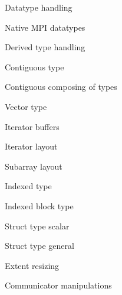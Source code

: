 \documentclass[10pt]{beamer}
\begin{document}
\begin{numberedframe}{Datatype handling}
  
\end{numberedframe}
\begin{numberedframe}{Native MPI datatypes}
  
\end{numberedframe}
\begin{numberedframe}{Derived type handling}
  
\end{numberedframe}
\begin{numberedframe}{Contiguous type}
  
\end{numberedframe}
\begin{numberedframe}{Contiguous composing of types}
  
\end{numberedframe}
\begin{numberedframe}{Vector type}
  
\end{numberedframe}
\begin{numberedframe}{Iterator buffers}
  
\end{numberedframe}
\begin{numberedframe}{Iterator layout}
  
\end{numberedframe}
\begin{numberedframe}{Subarray layout}
  
\end{numberedframe}
\begin{numberedframe}{Indexed type}
  
\end{numberedframe}
\begin{numberedframe}{Indexed block type}
  
\end{numberedframe}
\begin{numberedframe}{Struct type scalar}
  
\end{numberedframe}
\begin{numberedframe}{Struct type general}
  
\end{numberedframe}
\begin{numberedframe}{Extent resizing}
    
\end{numberedframe}

 {Communicator manipulations}
\end{document}
